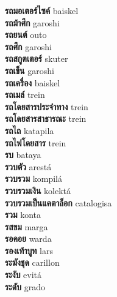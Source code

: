 \textbf{ รถมอเตอร์ไซค์  } baiskel \\
\textbf{ รถม้าศึก  } garoshi \\
\textbf{ รถยนต์  } outo \\
\textbf{ รถศึก  } garoshi \\
\textbf{ รถสกูตเตอร์  } skuter \\
\textbf{ รถเข็น  } garoshi \\
\textbf{ รถเครื่อง  } baiskel \\
\textbf{ รถเมล์  } trein \\
\textbf{ รถโดยสารประจำทาง  } trein \\
\textbf{ รถโดยสารสาธารณะ  } trein \\
\textbf{ รถไถ  } katapila \\
\textbf{ รถไฟโดยสาร  } trein \\
\textbf{ รบ  } bataya \\
\textbf{ รวบตัว  } arestá \\
\textbf{ รวบรวม  } kompilá \\
\textbf{ รวบรวมเงิน  } kolektá \\
\textbf{ รวบรวมเป็นแคตาล็อก  } catalogisa \\
\textbf{ รวม  } konta \\
\textbf{ รสขม  } marga \\
\textbf{ รอคอย  } warda \\
\textbf{ รองเท้าบูท  } lars \\
\textbf{ ระฆังชุด  } carillon \\
\textbf{ ระงับ  } evitá \\
\textbf{ ระดับ  } grado \\
